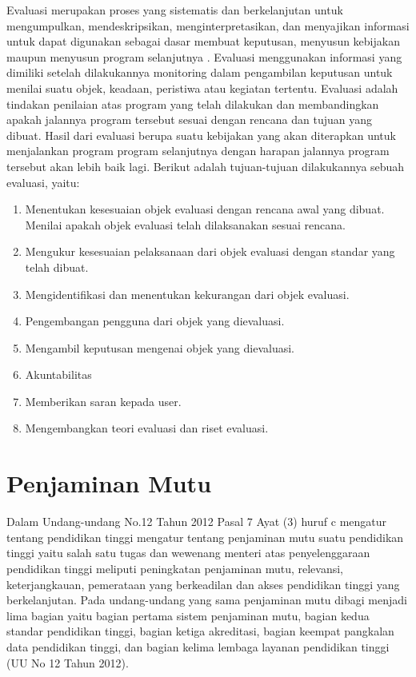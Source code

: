	Evaluasi merupakan proses yang sistematis dan berkelanjutan untuk mengumpulkan, mendeskripsikan, menginterpretasikan, dan menyajikan informasi untuk dapat digunakan sebagai dasar membuat keputusan, menyusun kebijakan maupun menyusun program selanjutnya \citep{Widoyoko}. Evaluasi menggunakan informasi yang dimiliki setelah dilakukannya monitoring dalam pengambilan keputusan untuk menilai suatu objek, keadaan, peristiwa atau kegiatan tertentu. Evaluasi adalah tindakan penilaian atas program yang telah dilakukan dan membandingkan apakah jalannya program tersebut sesuai dengan rencana dan tujuan yang dibuat. Hasil dari evaluasi berupa suatu kebijakan yang akan diterapkan untuk menjalankan program program selanjutnya dengan harapan jalannya program tersebut akan lebih baik lagi.
	Berikut adalah tujuan-tujuan dilakukannya sebuah evaluasi, yaitu: \citep{Wirawan2011}
\begin{enumerate}
	\item Menentukan kesesuaian objek evaluasi dengan rencana awal yang dibuat. Menilai apakah objek evaluasi telah dilaksanakan sesuai rencana.
	\item Mengukur kesesuaian pelaksanaan dari objek evaluasi dengan standar yang telah dibuat.
	\item Mengidentifikasi dan menentukan kekurangan dari objek evaluasi.
	\item Pengembangan pengguna dari objek yang dievaluasi.
	\item Mengambil keputusan mengenai objek yang dievaluasi.
	\item Akuntabilitas
	\item Memberikan saran kepada user.
	\item Mengembangkan teori evaluasi dan riset evaluasi.
\end{enumerate}

\section{Penjaminan Mutu}

	Dalam Undang-undang No.12 Tahun 2012 Pasal 7 Ayat (3) huruf c mengatur tentang pendidikan tinggi mengatur tentang penjaminan mutu suatu pendidikan tinggi yaitu salah satu tugas dan wewenang menteri atas penyelenggaraan pendidikan tinggi meliputi peningkatan penjaminan mutu, relevansi, keterjangkauan, pemerataan yang berkeadilan dan akses pendidikan tinggi yang berkelanjutan. Pada undang-undang yang sama penjaminan mutu dibagi menjadi lima bagian yaitu bagian pertama sistem penjaminan mutu, bagian kedua standar pendidikan tinggi, bagian ketiga akreditasi, bagian keempat pangkalan data pendidikan tinggi, dan bagian kelima lembaga layanan pendidikan tinggi (UU No 12 Tahun 2012).

